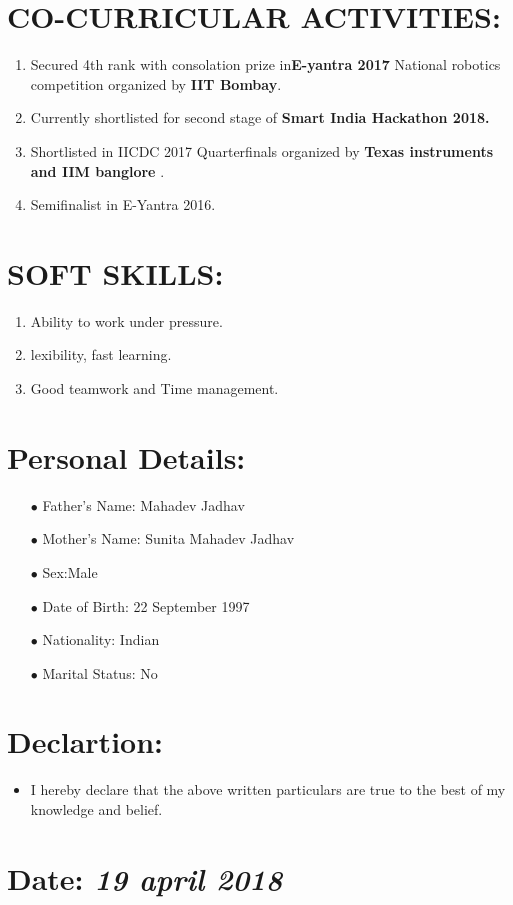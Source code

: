 \documentclass[16pt,a4paper]{article}
\begin{document}
\section{CO-CURRICULAR ACTIVITIES:}
\begin{enumerate}
	\item 	Secured 4th rank with consolation prize in\textbf{E-yantra 2017 }National robotics competition organized by\textbf{ IIT Bombay}.
	\item	Currently shortlisted for second stage of \textbf {Smart India Hackathon 2018.}
	\item	Shortlisted in IICDC 2017 Quarterfinals organized by\textbf{ Texas instruments and IIM banglore} .
	\item	Semifinalist in E-Yantra 2016.	
\end{enumerate}
\section{ SOFT SKILLS:}
\begin{enumerate}
	\item 	Ability to work under pressure.
	\item lexibility, fast learning.
	\item	Good teamwork and Time management.	
\end{enumerate}
\section{Personal Details:}
\begin{itemize}
	\item [$\bullet$]Father's Name: Mahadev Jadhav
	\item [$\bullet$]Mother's Name: Sunita Mahadev Jadhav
	\item [$\bullet$]Sex:Male
	\item [$\bullet$]Date of Birth: 22 September 1997
	\item [$\bullet$]Nationality: Indian
	\item [$\bullet$]Marital Status: No
\end{itemize}
	\section{Declartion:}
\begin{itemize}
	\item  I hereby declare that the above written particulars are true to the best of my knowledge and belief. 
\end{itemize}   
\section{Date: \textit{19 april 2018}}  
   
\end{document}

